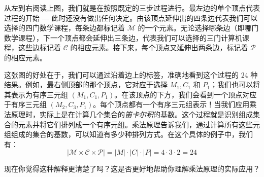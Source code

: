 \begin{example}
    \begin{center}
    \end{center}

    从左到右阅读上图，我们就是在按照既定的三步过程进行。最左边的单个顶点代表过程的开始 --- 此时还没有做出任何决定。由该顶点延伸出的四条边代表我们可以选择的四门数学课程，每条边都标记着 $\mathcal{M}$ 的一个元素。无论选择哪条边（即哪门数学课程），下一个顶点都会延伸出三条边，代表我们可以选择的三门计算机课程，这些边标记着 $\mathcal{C}$ 的相应元素。接下来，每个顶点又延伸出两条边，标记着 $\mathcal{P}$ 的相应元素。

    这张图的好处在于，我们可以通过沿着边上的标签，准确地看到这个过程的 $24$ 种结果。例如，最右侧顶部的那个顶点，它对应于选择 $M_1, C_1$ 和 $P_1$；我们也可以将其表示为有序三元组 $(M_1, C_1, P_1)$。在该顶点的下方，我们会看到一个顶点对应于有序三元组 $(M_2, C_3, P_1)$。每个顶点都有一个有序三元组表示！当我们应用乘法原理时，实际上是在计算几个集合的\emph{笛卡尔积}的基数。这个过程就是识别组成集合的元素并将它们排列成一个有序元组。乘法原理告诉我们，通过计算所有这些元组组成的集合的基数，可以知道有多少种排列方式。在这个具体的例子中，我们有：
    \[|\mathcal{M} \times \mathcal{C} \times \mathcal{P}| = |M| \cdot |C| \cdot |P| = 4 \cdot 3 \cdot 2 = 24\]

    现在你觉得这种解释更清楚了吗？这是否更好地帮助你理解乘法原理的实际应用？
\end{example}

